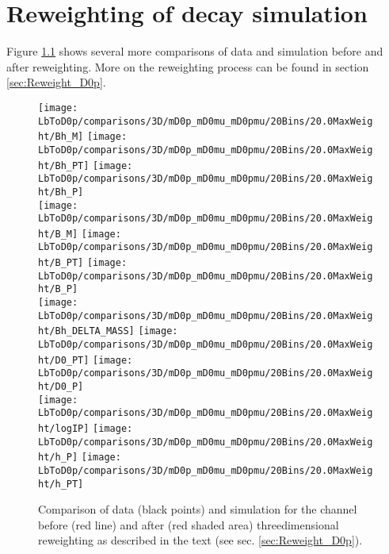 \chapter{Reweighting of \LbToDpmunuX decay simulation}
\label{app:Reweight_D0p}
Figure \ref{fig:reweight_D0p_app} shows several more comparisons of data and simulation before and after reweighting.
More on the reweighting process can be found in section \ref{sec:Reweight_D0p}.
\begin{figure}[hptb]
    \centering
	\texttt{[image: LbToD0p/comparisons/3D/mD0p\_mD0mu\_mD0pmu/20Bins/20.0MaxWeight/Bh\_M]}
	\texttt{[image: LbToD0p/comparisons/3D/mD0p\_mD0mu\_mD0pmu/20Bins/20.0MaxWeight/Bh\_PT]}
	\texttt{[image: LbToD0p/comparisons/3D/mD0p\_mD0mu\_mD0pmu/20Bins/20.0MaxWeight/Bh\_P]}          \\
	\texttt{[image: LbToD0p/comparisons/3D/mD0p\_mD0mu\_mD0pmu/20Bins/20.0MaxWeight/B\_M]}           
	\texttt{[image: LbToD0p/comparisons/3D/mD0p\_mD0mu\_mD0pmu/20Bins/20.0MaxWeight/B\_PT]}
	\texttt{[image: LbToD0p/comparisons/3D/mD0p\_mD0mu\_mD0pmu/20Bins/20.0MaxWeight/B\_P]}           \\
    \texttt{[image: LbToD0p/comparisons/3D/mD0p\_mD0mu\_mD0pmu/20Bins/20.0MaxWeight/Bh\_DELTA\_MASS]}
	\texttt{[image: LbToD0p/comparisons/3D/mD0p\_mD0mu\_mD0pmu/20Bins/20.0MaxWeight/D0\_PT]}
	\texttt{[image: LbToD0p/comparisons/3D/mD0p\_mD0mu\_mD0pmu/20Bins/20.0MaxWeight/D0\_P]}          \\
    \texttt{[image: LbToD0p/comparisons/3D/mD0p\_mD0mu\_mD0pmu/20Bins/20.0MaxWeight/logIP]}
	\texttt{[image: LbToD0p/comparisons/3D/mD0p\_mD0mu\_mD0pmu/20Bins/20.0MaxWeight/h\_P]}
	\texttt{[image: LbToD0p/comparisons/3D/mD0p\_mD0mu\_mD0pmu/20Bins/20.0MaxWeight/h\_PT]}
	\caption{Comparison of data (black points) and simulation for the \LbToDpmunuX channel before (red line) and after (red shaded area) threedimensional reweighting as described in the text (see sec. \ref{sec:Reweight_D0p}).}
    \label{fig:reweight_D0p_app}
\end{figure}
